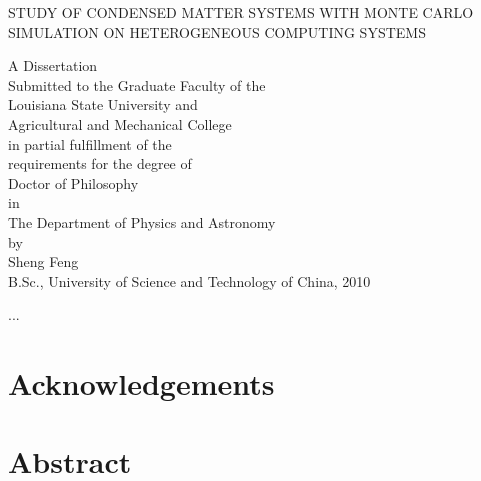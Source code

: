 \documentclass[edeposit,fullpage]{uiucthesis07}
\begin{document}
 \thispagestyle{empty} \begin{singlespace}

\begin{center}
\begin{Large}
STUDY OF CONDENSED MATTER SYSTEMS 
WITH MONTE CARLO SIMULATION
ON HETEROGENEOUS COMPUTING SYSTEMS
\end{Large}

\vspace{2.65in}

A Dissertation\\
\vspace{1.5ex}
Submitted to the Graduate Faculty of the\\
Louisiana State University and\\
Agricultural and Mechanical College\\
in partial fulfillment of the\\
requirements for the degree of\\
Doctor of Philosophy\\
\vspace{1ex}
in\\
\vspace{1ex}
The Department of Physics and Astronomy\\
\vspace{2.65in}
by\\
Sheng Feng\\
B.Sc., University of Science and Technology of China, 2010\\

\end{center}
\end{singlespace}
\frontmatter


\begin{dedication}
  ...
\end{dedication}

\chapter*{Acknowledgements}

\tableofcontents 

\chapter*{Abstract}
\end{document}
